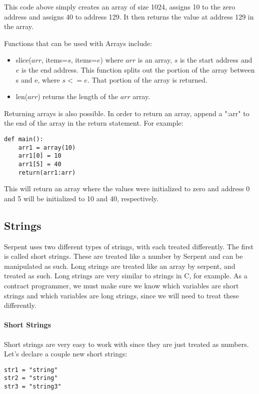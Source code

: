 \documentclass[12pt]{article}
\begin{document}
This code above simply creates an array of size 1024, assigns 10 to the zero address and assigns 40 to address 129. It then returns the value at address 129 in the array. \cite{Serpent,Serpent 1.0 (old)}

Functions that can be used with Arrays include:
\begin{itemize}
	\item slice($arr$, items=$s$, items=$e$) where $arr$ is an array, $s$ is the start address and $e$ is the end address. This function splits out the portion of the array between s and e, where $s <= e$. That portion of the array is returned.
	\item len($arr$) returns the length of the $arr$ array.
\end{itemize}

Returning arrays is also possible. In order to return an array, append a ":arr" to the end of the array in the return statement. For example:

\begin{lstlisting}
def main():
	arr1 = array(10)
	arr1[0] = 10
	arr1[5] = 40
	return(arr1:arr)
\end{lstlisting}

This will return an array where the values were initialized to zero and address 0 and 5 will be initialized to 10 and 40, respectively. \cite{Serpent}

\subsection{Strings}
	Serpent uses two different types of strings, with each treated differently. The first is called short strings. These are treated like a number by Serpent and can be manipulated as such. Long strings are treated like an array by serpent, and treated as such. Long strings are very similar to strings in C, for example. As a contract programmer, we must make sure we know which variables are short strings and which variables are long strings, since we will need to treat these differently. \cite{Serpent}

\paragraph{Short Strings}
	Short strings are very easy to work with since they are just treated as numbers. Let's declare a couple new short strings:
	
\begin{lstlisting}
str1 = "string"
str2 = "string"
str3 = "string3"
\end{lstlisting}
\end{document}
